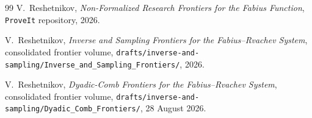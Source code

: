 \documentclass[11pt,oneside]{article}
\numberwithin{equation}{section}
\theoremstyle{definition}
\theoremstyle{remark}
\begin{document}
\begin{thebibliography}{99}
V.~Reshetnikov,
\newblock \emph{Non-Formalized Research Frontiers for the Fabius
Function},
\newblock \texttt{ProveIt} repository, 2026.

V.~Reshetnikov,
\newblock \emph{Inverse and Sampling Frontiers for the
Fabius--Rvachev System},
\newblock consolidated frontier volume,
\nolinkurl{drafts/inverse-and-sampling/Inverse_and_Sampling_Frontiers/},
2026.

V.~Reshetnikov,
\newblock \emph{Dyadic-Comb Frontiers for the Fabius--Rvachev
System},
\newblock consolidated frontier volume,
\nolinkurl{drafts/inverse-and-sampling/Dyadic_Comb_Frontiers/},
28 August 2026.

\end{thebibliography}
\end{document}
